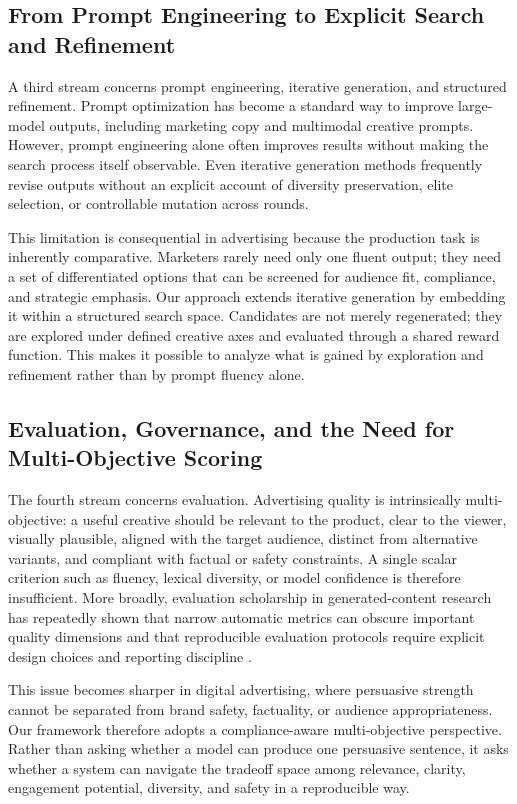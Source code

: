 \documentclass[applsci,article,submit,pdftex,moreauthors]{Definitions/mdpi}
\begin{document}
\subsection{From Prompt Engineering to Explicit Search and Refinement}

A third stream concerns prompt engineering, iterative generation, and structured refinement. Prompt optimization has become a standard way to improve large-model outputs, including marketing copy and multimodal creative prompts. However, prompt engineering alone often improves results without making the search process itself observable. Even iterative generation methods frequently revise outputs without an explicit account of diversity preservation, elite selection, or controllable mutation across rounds.

This limitation is consequential in advertising because the production task is inherently comparative. Marketers rarely need only one fluent output; they need a set of differentiated options that can be screened for audience fit, compliance, and strategic emphasis. Our approach extends iterative generation by embedding it within a structured search space. Candidates are not merely regenerated; they are explored under defined creative axes and evaluated through a shared reward function. This makes it possible to analyze what is gained by exploration and refinement rather than by prompt fluency alone.

\subsection{Evaluation, Governance, and the Need for Multi-Objective Scoring}

The fourth stream concerns evaluation. Advertising quality is intrinsically multi-objective: a useful creative should be relevant to the product, clear to the viewer, visually plausible, aligned with the target audience, distinct from alternative variants, and compliant with factual or safety constraints. A single scalar criterion such as fluency, lexical diversity, or model confidence is therefore insufficient. More broadly, evaluation scholarship in generated-content research has repeatedly shown that narrow automatic metrics can obscure important quality dimensions and that reproducible evaluation protocols require explicit design choices and reporting discipline \citep{vanderlee2019}.

This issue becomes sharper in digital advertising, where persuasive strength cannot be separated from brand safety, factuality, or audience appropriateness. Our framework therefore adopts a compliance-aware multi-objective perspective. Rather than asking whether a model can produce one persuasive sentence, it asks whether a system can navigate the tradeoff space among relevance, clarity, engagement potential, diversity, and safety in a reproducible way.
\end{document}
